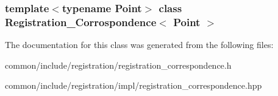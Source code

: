 \subsubsection*{template$<$typename Point$>$ class Registration\_\-Corrospondence$<$ Point $>$}



The documentation for this class was generated from the following files:\begin{DoxyCompactItemize}
\item 
common/include/registration/registration\_\-correspondence.h\item 
common/include/registration/impl/registration\_\-correspondence.hpp\end{DoxyCompactItemize}
